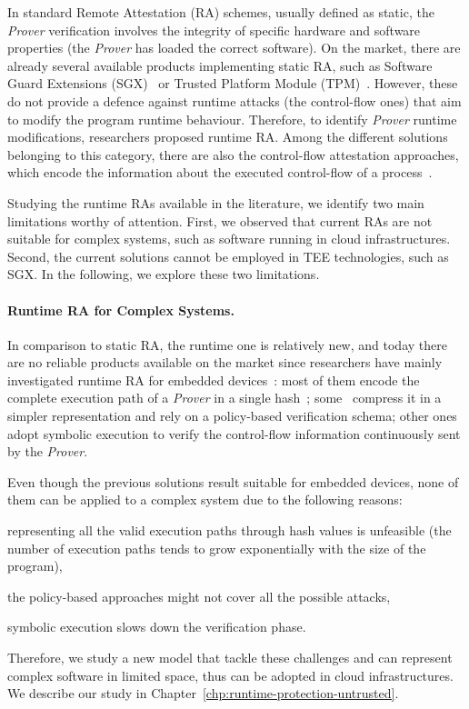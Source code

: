 In standard Remote Attestation (RA) schemes, usually defined as static, the 
\emph{Prover} verification involves the integrity of specific hardware and 
software properties (\eg the \emph{Prover} has loaded the correct software).
On the market, there are already several available products implementing 
static RA, such as Software Guard Extensions (SGX)~\citep{costan2016intel} or 
Trusted Platform Module (TPM)~\citep{tomlinson2017introduction}.
However, these do not provide a defence against runtime attacks (\eg the 
control-flow ones) that aim to modify the program runtime behaviour. 
Therefore, to identify \emph{Prover} runtime modifications, researchers 
proposed runtime RA. Among the different solutions belonging to this category, 
there are also the control-flow attestation approaches, which
encode the information about the executed control-flow of a 
process~\citep{abera2016c,aberadiat}.

Studying the runtime RAs available in the literature, we identify two main 
limitations worthy of attention. 
First, we observed that current RAs are not suitable for complex systems, such 
as software running in cloud infrastructures.
Second, the current solutions cannot be employed in TEE technologies, such as 
SGX.
In the following, we explore these two limitations.

\paragraph{Runtime RA for Complex Systems.} 

In comparison to static RA, the runtime one is relatively new, and today there 
are no reliable products available on the market since researchers have mainly 
investigated runtime RA for embedded 
devices~\citep{abera2016c,zeitouni2017atrium,aberadiat,dessouky2017fat,Dessouky:2018:LLH:3240765.3240821}:
most of them encode the complete execution path of a \emph{Prover} in a single 
hash~\citep{abera2016c,zeitouni2017atrium,dessouky2017fat}; 
some~\citep{aberadiat} compress it in a simpler representation and rely on a 
policy-based verification schema; 
other ones~\citep{Dessouky:2018:LLH:3240765.3240821} adopt symbolic execution 
to verify the control-flow information continuously sent by the \emph{Prover}.

Even though the previous solutions result suitable for embedded devices, none 
of them can be applied to a complex system due to the following reasons: 
\begin{enumerate*}[label=(\roman*)]
	\item representing all the valid execution paths through hash values is 
	unfeasible (\eg the number of execution paths tends to grow exponentially 
	with the size of the program),
	\item the policy-based approaches might not cover all the possible attacks,
	\item symbolic execution slows down the verification phase.
\end{enumerate*}
Therefore, we study a new model that tackle these challenges and can represent 
complex software in limited space, thus can be adopted in cloud 
infrastructures. 
We describe our study in Chapter~\ref{chp:runtime-protection-untrusted}.


